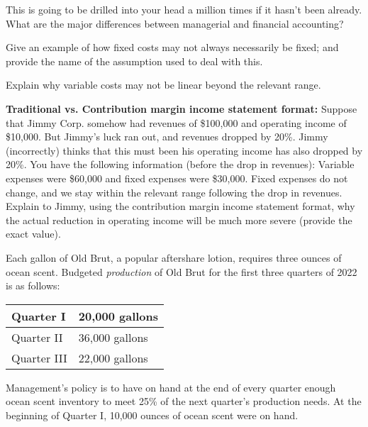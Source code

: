 \documentclass{scrartcl}
\begin{document}
\newpage

This is going to be drilled into your head a million times if it hasn't
been already. What are the major differences between managerial and
financial accounting?

\vspace{10em}

Give an example of how fixed costs may not always necessarily be fixed; and
provide the name of the assumption used to deal with this.

\vspace{10em}

Explain why variable costs may not be linear beyond the relevant range.

\vspace{10em}

\textbf{Traditional vs. Contribution margin income statement format:} 
Suppose that Jimmy Corp. somehow had revenues of \$100,000 and operating
income of \$10,000. But Jimmy's luck ran out, and revenues dropped by
20\%. Jimmy (incorrectly) thinks that this must been his operating
income has also dropped by 20\%. You have the following information
(before the drop in revenues): Variable expenses were \$60,000 and fixed
expenses were \$30,000. Fixed expenses do not change, and we stay
within the relevant range following the drop in revenues. Explain to
Jimmy, using the contribution margin income statement format, why the
actual reduction in operating income will be much more severe (provide
the exact value).

\vspace{10em}

Each gallon of Old Brut, a popular aftershare lotion, requires three 
ounces of ocean scent. Budgeted \emph{production} of Old Brut for the
first three quarters of 2022 is as follows:

\medskip

\begin{tabular}{|l|l|} \hline
	Quarter I & 20,000 gallons \\ \hline
	Quarter II & 36,000 gallons \\ \hline
	Quarter III & 22,000 gallons \\ \hline
\end{tabular}

\medskip

Management's policy is to have on hand at the end of every quarter 
enough ocean scent inventory to meet 25\% of the next quarter's 
production needs. At the beginning of Quarter I, 10,000 ounces of
ocean scent were on hand.
\end{document}
